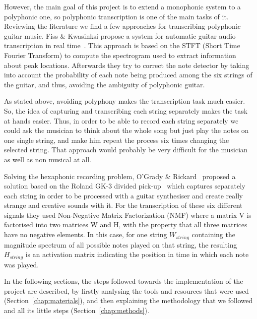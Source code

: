 However, the main goal of this project is to extend a monophonic system to a polyphonic one, so polyphonic transcription is one of the main tasks of it. Reviewing the literature we find a few approaches for transcribing polyphonic guitar music. Fiss \& Kwasinksi propose a system for automatic guitar audio transcription in real time~\cite{Fiss2011}. This approach is based on the STFT (Short Time Fourier Transform) to compute the spectrogram used to extract information about peak locations. Afterwards they try to correct the note detector by taking into account the probability of each note being produced among the six strings of the guitar, and thus, avoiding the ambiguity of polyphonic guitar.
 
As stated above, avoiding polyphony makes the transcription task much easier. So, the idea of capturing and transcribing each string separately makes the task at hands easier. Thus, in order to be able to record each string separately we could ask the musician to think about the whole song but just play the notes on one single string, and make him repeat the process six times changing the selected string. That approach would probably be very difficult for the musician as well as non musical at all. 

Solving the hexaphonic recording problem, O'Grady \& Rickard~\cite{OGrady2009} proposed a solution based on the Roland GK-3 divided pick-up~\cite{gk3} which captures separately each string in order to be processed with a guitar synthesiser and create really strange and creative sounds with it. For the transcription of these six different signals they used Non-Negative Matrix Factorization (NMF) where a matrix V is factorised into two matrices W and H, with the property that all three matrices have no negative elements. In this case, for one string $W_{string}$ containing the magnitude spectrum of all possible notes played on that string, the resulting $H_{string}$ is an activation matrix indicating the position in time in which each note was played.

In the following sections, the steps followed towards the implementation of the project are described, by firstly analysing the tools and resources that were used (Section~\ref{chap:materials}), and then explaining the methodology that we followed and all its little steps (Section~\ref{chap:methods}).

\cleardoublepage